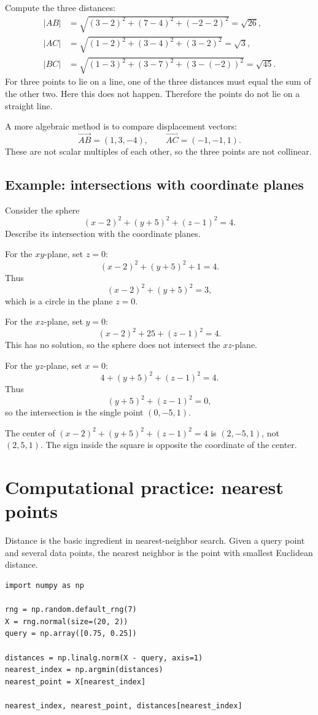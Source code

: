 Compute the three distances:
\[
\begin{aligned}
|AB|&=\sqrt{(3-2)^2+(7-4)^2+(-2-2)^2}=\sqrt{26},\\
|AC|&=\sqrt{(1-2)^2+(3-4)^2+(3-2)^2}=\sqrt{3},\\
|BC|&=\sqrt{(1-3)^2+(3-7)^2+(3-(-2))^2}=\sqrt{45}.
\end{aligned}
\]
For three points to lie on a line, one of the three distances must equal the sum of the other two. Here this does not happen. Therefore the points do not lie on a straight line.

A more algebraic method is to compare displacement vectors:
\[
  \overrightarrow{AB}=(1,3,-4),\qquad \overrightarrow{AC}=(-1,-1,1).
\]
These are not scalar multiples of each other, so the three points are not collinear.

\subsection*{Example: intersections with coordinate planes}

Consider the sphere
\[
  (x-2)^2+(y+5)^2+(z-1)^2=4.
\]
Describe its intersection with the coordinate planes.

For the $xy$-plane, set $z=0$:
\[
  (x-2)^2+(y+5)^2+1=4.
\]
Thus
\[
  (x-2)^2+(y+5)^2=3,
\]
which is a circle in the plane $z=0$.

For the $xz$-plane, set $y=0$:
\[
  (x-2)^2+25+(z-1)^2=4.
\]
This has no solution, so the sphere does not intersect the $xz$-plane.

For the $yz$-plane, set $x=0$:
\[
  4+(y+5)^2+(z-1)^2=4.
\]
Thus
\[
  (y+5)^2+(z-1)^2=0,
\]
so the intersection is the single point $(0,-5,1)$.

\begin{warningbox}[title={Check the signs}]
The center of $(x-2)^2+(y+5)^2+(z-1)^2=4$ is $(2,-5,1)$, not $(2,5,1)$. The sign inside the square is opposite the coordinate of the center.
\end{warningbox}

\section{Computational practice: nearest points}

Distance is the basic ingredient in nearest-neighbor search. Given a query point and several data points, the nearest neighbor is the point with smallest Euclidean distance.

\begin{lstlisting}[style=pythonstyle,caption={Nearest-neighbor search using Euclidean distance.}]
import numpy as np

rng = np.random.default_rng(7)
X = rng.normal(size=(20, 2))
query = np.array([0.75, 0.25])

distances = np.linalg.norm(X - query, axis=1)
nearest_index = np.argmin(distances)
nearest_point = X[nearest_index]

nearest_index, nearest_point, distances[nearest_index]
\end{lstlisting}


